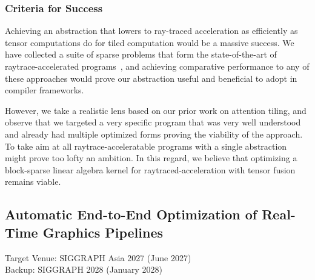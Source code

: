 \documentclass[review, acmsmall, nonacm]{acmart}
\begin{document}


\subsubsection{Criteria for Success} Achieving an abstraction that lowers to ray-traced acceleration as efficiently as tensor computations do for tiled computation would be a massive success. We have collected a suite of sparse problems that form the state-of-the-art of raytrace-accelerated programs~\cite{menesesAcceleratingRangeMinimum2024,bauerVisibilityAlgorithmsDynamic2023,haGeneralizingRayTracing2024,Evangelou2021RadiusSearch,zhangMLIRLinalgDialect2022,hennebergRTIndeXExploitingHardwareAccelerated2023}, and achieving comparative performance to any of these approaches would prove our abstraction useful and beneficial to adopt in compiler frameworks.

However, we take a realistic lens based on our prior work on attention tiling, and observe that we targeted a very specific program that was very well understood and already had multiple optimized forms proving the viability of the approach. To take aim at all raytrace-acceleratable programs with a single abstraction might prove too lofty an ambition. In this regard, we believe that optimizing a block-sparse linear algebra kernel for raytraced-acceleration with tensor fusion remains viable.

\subsection{Automatic End-to-End Optimization of Real-Time Graphics Pipelines}

Target Venue: SIGGRAPH Asia 2027 (June 2027) \\
Backup: SIGGRAPH 2028 (January 2028)

\end{document}
